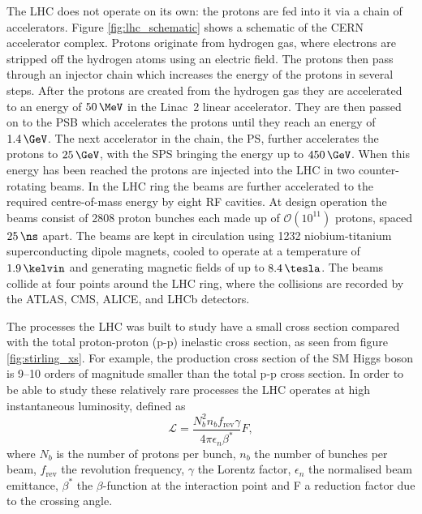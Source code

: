 The \ac{LHC} does not operate on its own: the protons are fed into
it via a chain of accelerators. Figure \ref{fig:lhc_schematic} shows a schematic
of the \ac{CERN} accelerator complex.
Protons originate from hydrogen gas, where electrons are stripped off the 
hydrogen atoms using an electric field. The protons then pass through an injector
chain which increases the energy of the protons in several steps. After the protons
are created from the hydrogen gas they are accelerated to an energy of
$50\,\MeV$ in the Linac~2 linear accelerator. They are then passed on to the
\acf{PSB} which accelerates the protons until they reach an energy of $1.4\,\GeV$.
The next accelerator in the chain, the \acf{PS}, further accelerates the protons to $25\,\GeV$,
with the \acf{SPS} bringing the energy up to $450\,\GeV$. When this energy has been 
reached the protons are injected into the \ac{LHC} in two counter-rotating
beams. In the \ac{LHC} ring the beams are further accelerated to the required centre-of-mass energy
by eight \ac{RF} cavities. At design operation the beams consist of 2808 proton bunches each made up 
of $\mathcal{O}(10^{11})$ protons, spaced $25\,\ns$ apart. The beams are kept in circulation
using 1232 niobium-titanium superconducting dipole magnets, cooled to operate at 
a temperature of $1.9\,\kelvin$ and generating magnetic fields of up to $8.4\,\tesla$.
The beams collide at four points
around the \ac{LHC} ring, where the collisions are recorded by the ATLAS\cite{atlas-jinst}, 
\acs{CMS}\cite{cms-jinst}, ALICE\cite{alice-jinst}, and LHCb\cite{lhcb-jinst} detectors.

The processes the \ac{LHC} was built to study have a small cross section
compared with the total proton-proton (p-p) inelastic cross section, as seen from figure
\ref{fig:stirling_xs}. For example, the production cross section of the
\ac{SM} Higgs boson is 9--10 orders of magnitude smaller than the total p-p cross section.
In order to be able to study these relatively rare processes  
the \ac{LHC} operates at high instantaneous luminosity, defined as
\begin{equation}\label{eqn:CMSLHC_luminosity}
\mathcal{L} = \frac{N_b^2n_bf_{\text{rev}}\gamma}{4\pi\epsilon_n\beta^{*}}F,
\end{equation}
where $N_b$ is the number of protons per bunch, $n_b$ the number of
bunches per beam, $f_{\text{rev}}$ the revolution frequency, $\gamma$ the 
Lorentz factor, $\epsilon_n$ the normalised beam
emittance, $\beta^{*}$ the $\beta$-function at the interaction point and F a reduction
factor due to the crossing angle. 

